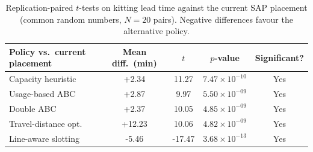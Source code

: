 \begin{table}[htbp]
\centering
\caption{Replication-paired $t$-tests on kitting lead time against the current SAP
placement (common random numbers, $N=20$ pairs). Negative differences favour the
alternative policy.}
\label{tab:paired_t}
\begin{tabular}{lcccc}
\toprule
Policy vs.\ current placement & Mean diff.\ (min) & $t$ & $p$-value & Significant? \\
\midrule
Capacity heuristic & +2.34 & 11.27 & $7.47 \times 10^{-10}$ & Yes \\
Usage-based ABC & +2.87 & 9.97 & $5.50 \times 10^{-09}$ & Yes \\
Double ABC & +2.37 & 10.05 & $4.85 \times 10^{-09}$ & Yes \\
Travel-distance opt. & +12.23 & 10.06 & $4.82 \times 10^{-09}$ & Yes \\
Line-aware slotting & -5.46 & -17.47 & $3.68 \times 10^{-13}$ & Yes \\
\bottomrule
\end{tabular}
\end{table}
